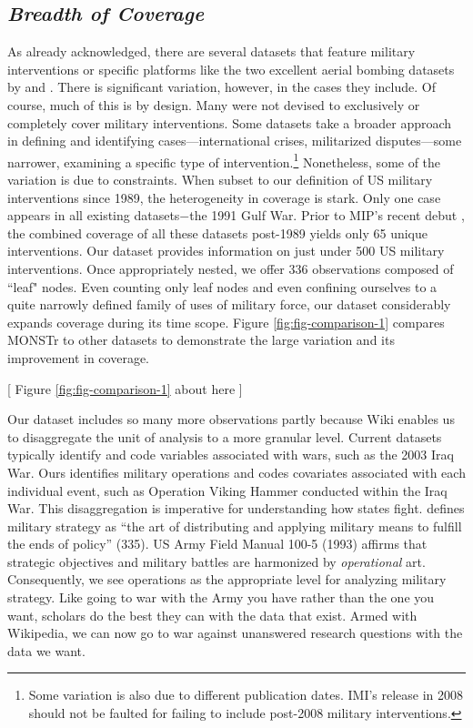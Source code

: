 \documentclass[fleqn,12pt]{article}
\begin{document}
\subsection*{\textit{Breadth of Coverage}}
As already acknowledged, there are several datasets that feature military interventions or specific platforms like the two excellent aerial bombing datasets by \citet{horowitz_whendoesaerial_2001} and \citet{allen_understandingimpactair_2017}. There is significant variation, however, in the cases they include. Of course, much of this is by design. Many were not devised to exclusively or completely cover military interventions. Some datasets take a broader approach in defining and identifying cases—international crises, militarized disputes—some narrower, examining a specific type of intervention.\footnote{Some variation is also due to different publication dates. IMI's release in 2008 should not be faulted for failing to include post-2008 military interventions.} Nonetheless, some of the variation is due to constraints. When subset to our definition of US military interventions since 1989, the heterogeneity in coverage is stark. Only one case appears in all existing datasets$-$the 1991 Gulf War. Prior to MIP’s recent debut \citep{kushi_introducingmilitaryintervention_2022}, the combined coverage of all these datasets post-1989 yields only 65 unique interventions. Our dataset provides information on just under 500 US military interventions. Once appropriately nested, we offer 336 observations composed of ``leaf" nodes. Even counting only leaf nodes and even confining ourselves to a quite narrowly defined family of uses of military force, our dataset considerably expands coverage during its time scope. Figure \ref{fig:fig-comparison-1} compares MONSTr to other datasets to demonstrate the large variation and its improvement in coverage.

\begin{center}
    [ Figure \ref{fig:fig-comparison-1} about here ]
\end{center}

Our dataset includes so many more observations partly because Wiki enables us to disaggregate the unit of analysis to a more granular level. Current datasets typically identify and code variables associated with wars, such as the 2003 Iraq War. Ours identifies military operations and codes covariates associated with each individual event, such as Operation Viking Hammer conducted within the Iraq War. This disaggregation is imperative for understanding how states fight. \citet{hart_strategyindirectapproach_1967} defines military strategy as ``the art of distributing and applying military means to fulfill the ends of policy” (335). US Army Field Manual 100-5 (1993) affirms that strategic objectives and military battles are harmonized by \textit{operational} art. Consequently, we see operations as the appropriate level for analyzing military strategy. Like going to war with the Army you have rather than the one you want, scholars do the best they can with the data that exist. Armed with Wikipedia, we can now go to war against unanswered research questions with the data we want.
\end{document}
